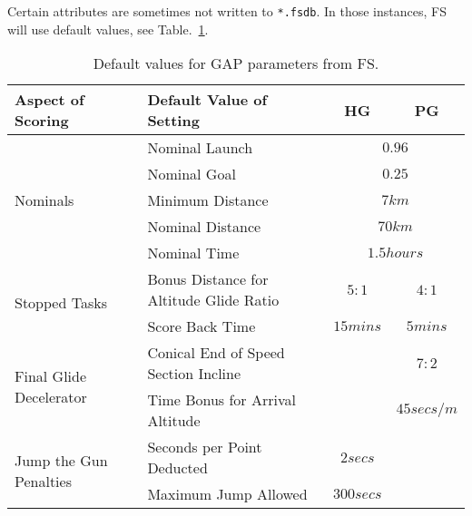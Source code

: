\documentclass[gap.tex]{subfiles}
\begin{document}
Certain attributes are sometimes not written to \texttt{*.fsdb}. In those
instances, FS will use default values, see Table.~\ref{tab:gap-defaults}.

\begin{table}[!ht]
    \begin{tabularx}{\textwidth}{|l|X|c|c|}
    \hline
        \textbf{Aspect of Scoring}
        & \textbf{Default Value of Setting}
        & \textbf{HG}
        & \textbf{PG}
        \\
    \hline
        \multirow{5}{*}{Nominals}
        & Nominal Launch
        & \multicolumn{2}{c|}{$0.96$}
        \\
    \cline{2-4}
        & Nominal Goal
        & \multicolumn{2}{c|}{$0.25$}
        \\
    \cline{2-4}
        & Minimum Distance
        & \multicolumn{2}{c|}{$7 km$}
        \\
    \cline{2-4}
        & Nominal Distance
        & \multicolumn{2}{c|}{$70 km$}
        \\
    \cline{2-4}
        & Nominal Time
        & \multicolumn{2}{c|}{$1.5 hours$}
        \\
    \hline
        \multirow{2}{*}{Stopped Tasks}
        & Bonus Distance for Altitude Glide Ratio
        & $5:1$
        & $4:1$
        \\
    \cline{2-4}
        & Score Back Time
        & $15 mins$
        & $5 mins$
        \\
    \hline
        \multirow{2}{*}{Final Glide Decelerator}
        & Conical End of Speed Section Incline
        &
        & $7:2$
        \\
    \cline{2-4}
        & Time Bonus for Arrival Altitude
        &
        & $45 secs / m$
        \\
    \hline
        \multirow{2}{*}{Jump the Gun Penalties}
        & Seconds per Point Deducted
        & $2 secs$
        &
        \\
    \cline{2-4}
        & Maximum Jump Allowed
        & $300 secs$
        &
        \\
    \hline
    \end{tabularx}
    \caption{Default values for GAP parameters from FS.}
    \label{tab:gap-defaults}
\end{table}
\end{document}
